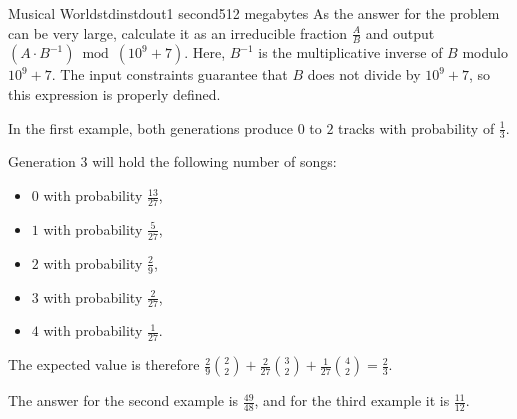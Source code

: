 \begin{problem}{Musical World}{stdin}{stdout}{1 second}{512 megabytes}
\OutputFile
As the answer for the problem can be very large, calculate it as an irreducible fraction $\frac{A}{B}$ and output $(A \cdot B^{-1}) \bmod (10^{9} + 7)$. Here, $B^{-1}$ is the multiplicative inverse of $B$ modulo $10^{9} + 7$. The input constraints guarantee that $B$ does not divide by $10^{9} + 7$, so this expression is properly defined.

\Examples

\begin{example}
%
%
%
\end{example}

\Note
In the first example, both generations produce $0$ to $2$ tracks with probability of  $\frac{1}{3}$.

Generation $3$ will hold the following number of songs:

\begin{itemize}
\item $0$ with probability $\frac{13}{27}$,
\item $1$ with probability $\frac{5}{27}$,
\item $2$ with probability $\frac{2}{9}$,
\item $3$ with probability $\frac{2}{27}$,
\item $4$ with probability $\frac{1}{27}$.
\end{itemize}

The expected value is therefore $\frac{2}{9}\binom{2}{2} + \frac{2}{27}\binom{3}{2} + \frac{1}{27}\binom{4}{2} = \frac{2}{3}$.

The answer for the second example is $\frac{49}{48}$, and for the third example it is $\frac{11}{12}$.

\end{problem}
